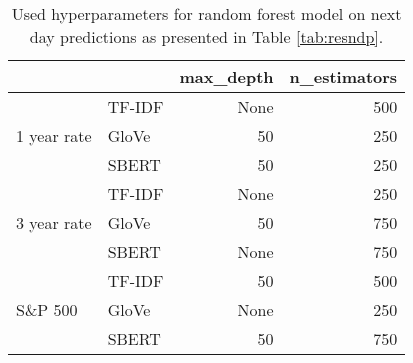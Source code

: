 \begin{table}[H]
    \centering
    \begin{tabular}{llrr}
          & & \textbf{max\_depth} & \textbf{n\_estimators} \\
         \hline \hline
         \multirow{3}{*}{1 year rate} & TF-IDF & None & 500   \\
         & GloVe & 50 & 250    \\
         & SBERT & 50 & 250   \\
         \hline 
         \multirow{3}{*}{3 year rate} & TF-IDF & None & 250   \\
         & GloVe & 50 & 750 \\
         & SBERT & None & 750 \\
         \hline 
         \multirow{3}{*}{S\&P 500} & TF-IDF & 50 & 500 \\
         & GloVe & None & 250 \\
         & SBERT & 50 & 750 \\
         \hline 
    \end{tabular}
    \caption{Used hyperparameters for random forest model on next day predictions as presented in Table \ref{tab:resndp}.}
    \label{tab:rf_hyper_nd}
\end{table}